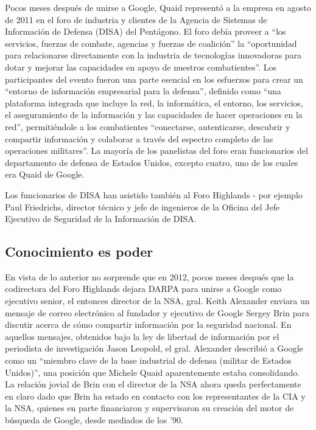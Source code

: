 \documentclass[10pt,a5paper,twoside,spanish,]{book}
\begin{document}
Pocos meses después de unirse a Google, Quaid representó a la empresa en
agosto de 2011 en el foro de industria y clientes de la Agencia de
Sistemas de Información de Defensa (DISA) del Pentágono. El foro debía
proveer a ``los servicios, fuerzas de combate, agencias y fuerzas de
coalición'' la ``oportunidad para relacionarse directamente con la
industria de tecnologías innovadoras para dotar y mejorar las
capacidades en apoyo de nuestros combatientes''. Los participantes del
evento fueron una parte esencial en los esfuerzos para crear un
``entorno de información empresarial para la defensa'', definido como
``una plataforma integrada que incluye la red, la informática, el
entorno, los servicios, el aseguramiento de la información y las
capacidades de hacer operaciones en la red'', permitiéndole a los
combatientes ``conectarse, autenticarse, descubrir y compartir
información y colaborar a través del espectro completo de las
operaciones militares''. La mayoría de los panelistas del foro eran
funcionarios del departamento de defensa de Estados Unidos, excepto
cuatro, uno de los cuales era Quaid de Google.

Los funcionarios de DISA han asistido también al Foro Highlands - por
ejemplo Paul Friedrichs, director técnico y jefe de ingenieros de la
Oficina del Jefe Ejecutivo de Seguridad de la Información de DISA.

\subsection{Conocimiento es poder}\label{conocimiento-es-poder}

En vista de lo anterior no sorprende que en 2012, pocos meses después
que la codirectora del Foro Highlands dejara DARPA para unirse a Google
como ejecutivo senior, el entonces director de la NSA, gral. Keith
Alexander enviara un mensaje de correo electrónico al fundador y
ejecutivo de Google Sergey Brin para discutir acerca de cómo compartir
información por la seguridad nacional. En aquellos mensajes, obtenidos
bajo la ley de libertad de información por el periodista de
investigación Jason Leopold, el gral. Alexander describió a Google como
un ``miembro clave de la base industrial de defensa (militar de Estados
Unidos)'', una posición que Michele Quaid aparentemente estaba
consolidando. La relación jovial de Brin con el director de la NSA ahora
queda perfectamente en claro dado que Brin ha estado en contacto con los
representantes de la CIA y la NSA, quienes en parte financiaron y
supervisaron su creación del motor de búsqueda de Google, desde mediados
de los '90.
\end{document}

